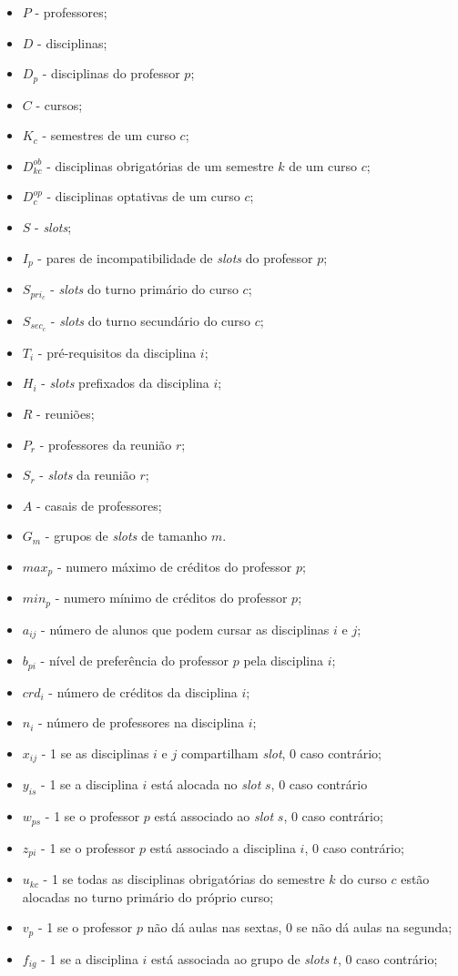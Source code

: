 \begin{itemize}
    \item $P$ - professores;
    \item $D$ - disciplinas;
    \item $D_p$ - disciplinas do professor $p$;
    \item $C$ - cursos;
    \item $K_c$ - semestres de um curso $c$;
    \item $D_{kc}^{ob}$ - disciplinas obrigatórias de um semestre $k$ de um curso $c$;
    \item $D_{c}^{op}$ - disciplinas optativas de um curso $c$;
	\item $S$ - \textit{slots};
	\item $I_p$ - pares de incompatibilidade de \textit{slots} do professor $p$;
	\item $S_{pri_c}$ - \textit{slots} do turno primário do curso $c$;
	\item $S_{sec_c}$ - \textit{slots} do turno secundário do curso $c$;
	\item $T_i$ - pré-requisitos da disciplina $i$;
	\item $H_i$ - \textit{slots} prefixados da disciplina $i$;
	\item $R$ - reuniões;
	\item $P_r$ - professores da reunião $r$;
	\item $S_r$ - \textit{slots} da reunião $r$;
	\item $A$ - casais de professores;
	\item $G_m$ - grupos de \textit{slots} de tamanho $m$.
	\item $max_p$ - numero máximo de créditos do professor $p$;
    \item $min_p$ - numero mínimo de créditos do professor $p$;
	\item $a_{ij}$ - número de alunos que podem cursar as disciplinas $i$ e $j$;
	\item $b_{pi}$ - nível de preferência do professor $p$ pela disciplina $i$;	
	\item $crd_i$ - número de créditos da disciplina $i$;
	\item $n_i$ - número de professores na disciplina $i$;
    \item $x_{ij}$ - 1 se as disciplinas  $i$ e $j$ compartilham \textit{slot}, 0 caso contrário;
	\item $y_{is}$ - 1 se a disciplina $i$ está alocada no \textit{slot} $s$, 0 caso contrário
	\item $w_{ps}$ - 1 se o professor $p$ está associado ao \textit{slot} $s$, 0 caso contrário;
	\item $z_{pi}$ - 1 se o professor $p$ está associado a disciplina $i$, 0 caso contrário;
	\item $u_{kc}$ - 1 se todas as disciplinas obrigatórias do semestre $k$ do curso $c$ estão alocadas no turno primário do próprio curso;
	\item $v_p$ - 1 se o professor $p$ não dá aulas nas sextas, 0 se não dá aulas na segunda; 
	\item $f_{ig}$ - 1 se a disciplina $i$ está associada ao grupo de \textit{slots} $t$, 0 caso contrário;
\end{itemize} 

